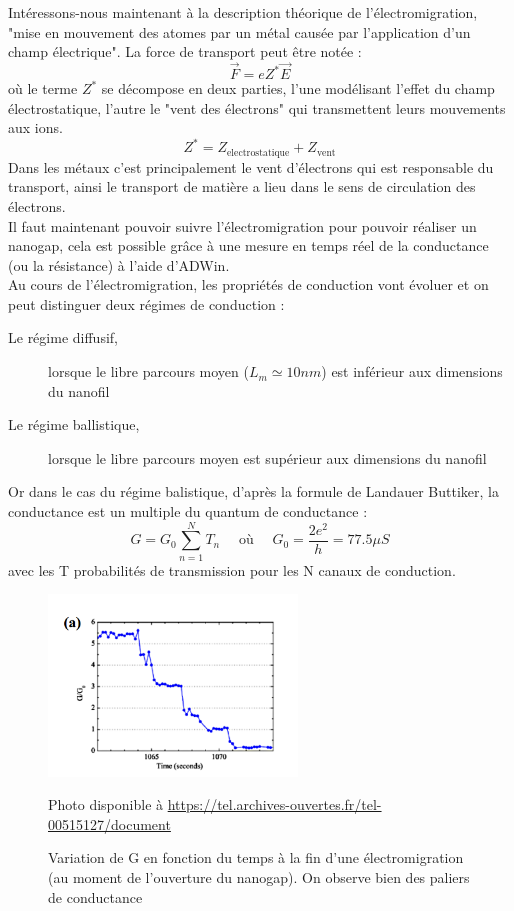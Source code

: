 Intéressons-nous maintenant à la description théorique de l'électromigration, "mise en mouvement des atomes par un métal causée par l'application d'un champ électrique". La force de transport peut être notée :
\[\vec{F}=e Z^* \vec{E}\]
où le terme $Z^*$ se décompose en deux parties, l'une modélisant l'effet du champ électrostatique, l'autre le "vent des électrons" qui transmettent leurs mouvements aux ions.
\[Z^* = Z_{\text{electrostatique}} + Z_{\text{vent}}\]
Dans les métaux c'est principalement le vent d'électrons qui est responsable du transport, ainsi le transport de matière a lieu dans le sens de circulation des électrons\cite{10}.\\

Il faut maintenant pouvoir suivre l'électromigration pour pouvoir réaliser un nanogap, cela est possible grâce à une mesure en temps réel de la conductance (ou la résistance) à l'aide d'ADWin.\\

Au cours de l'électromigration, les propriétés de conduction vont évoluer et on peut distinguer deux régimes de conduction :
\begin{description}
    \item[Le régime diffusif,] lorsque le libre parcours moyen ($L_m \simeq 10nm$) est inférieur aux dimensions du nanofil
    \item[Le régime ballistique,] lorsque le libre parcours moyen est supérieur aux dimensions du nanofil
\end{description}

Or dans le cas du régime balistique, d'après la formule de Landauer Buttiker, la conductance est un multiple du quantum de conductance :
\[G = G_0 \sum_{n=1}^N T_n \quad \text{ où } \quad G_0 = \frac{2e^2}{h} = 77.5 \mu S\]
avec les T probabilités de transmission pour les N canaux de conduction.
\begin{figure}[h]
    \begin{center}
        \includegraphics[width=250px]{Images/Electromigration_graphe}
        \caption{Variation de G en fonction du temps à la fin d’une électromigration (au moment de l’ouverture du nanogap).
On observe bien des paliers de conductance}
        Photo disponible à \url{https://tel.archives-ouvertes.fr/tel-00515127/document}
        \label{fig:}
    \end{center}
\end{figure}

